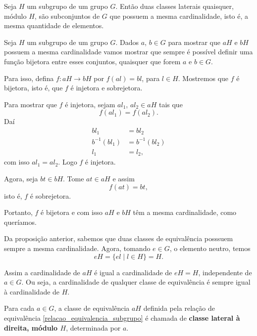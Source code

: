 \begin{proposicao}
    Seja $H$ um subgrupo de um grupo $G$. Então duas classes laterais quaisquer, módulo $H$, são subconjuntos de $G$ que possuem a mesma cardinalidade, isto é, a mesma quantidade de elementos.
\end{proposicao}
\begin{prova}
    Seja $H$ um subgrupo de um grupo $G$. Dados $a$, $b \in G$ para mostrar que $aH$ e $bH$ possuem a mesma cardinalidade vamos mostrar que sempre é possível definir uma função bijetora entre esses conjuntos, quaisquer que forem $a$ e $b \in G$.

    Para isso, defina $f : aH \to bH$ por $f(al) = bl$, para $l \in H$. Mostremos que $f$ é bijetora, isto é, que $f$ é injetora e sobrejetora.

    Para mostrar que $f$ é injetora, sejam $al_1$, $al_2 \in aH$ tais que
    \[
        f(al_1) = f(al_2).
    \]
    Daí
    \begin{align*}
        bl_1 &= bl_2\\
        b^{-1}(bl_1) &= b^{-1}(bl_2)\\
        l_1 &= l_2,
    \end{align*}
    com isso $al_1 = al_2$. Logo $f$ é injetora.

    Agora, seja $bt \in bH$. Tome $at \in aH$ e assim
    \[
        f(at) = bt,
    \]
    isto é, $f$ é sobrejetora.

    Portanto, $f$ é bijetora e com isso $aH$ e $bH$ têm a mesma cardinalidade, como queríamos.
\end{prova}

\begin{observacao}
    Da proposição anterior, sabemos que duas classes de equivalência posssuem sempre a mesma cardinalidade. Agora, tomando $e \in G$, o elemento neutro, temos
    \[
        eH = \{el \mid l \in H\} = H.
    \]

    Assim a cardinalidade de $aH$ é igual a cardinalidade de $eH = H$, independente de $a \in G$. Ou seja, a cardinalidade de qualquer classe de equivalência é sempre igual à cardinalidade de $H$.
\end{observacao}

\begin{definicao}
    Para cada $a \in G$, a classe de equivalência $aH$ definida pela relação de equivalência \eqref{relacao_equivalencia_subgrupo} é chamada de \textbf{classe lateral à direita, módulo $H$}, determinada por $a$.
\end{definicao}


